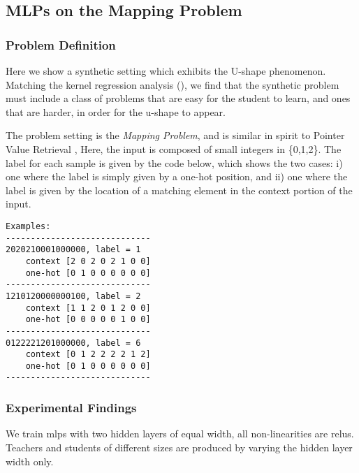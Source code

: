 \subsection{MLPs on the Mapping Problem}
\label{ssec:mlps-on-the-mapping-problem}

\subsubsection{Problem Definition}
\label{sssec:problem-definition}

Here we show a synthetic setting which exhibits the U-shape phenomenon. 
Matching the kernel regression analysis (), 
we find that the synthetic problem must include a class of problems that are easy for the student to learn, and ones that are harder, in order for the u-shape to appear.

The problem setting is the \emph{Mapping Problem}, and is 
similar in spirit to Pointer Value Retrieval \citep{DBLP:journals/corr/abs-2107-12580},
Here, the input is composed of small integers in \{0,1,2\}. 
The label for each sample is given by the code below, which shows the two cases: i) one where the label is simply given by a one-hot position, and ii) one where the label is given by the location of a matching element in the context portion of the input.  

\begin{minipage}{.6\textwidth}
	
\end{minipage}
\begin{minipage}{.4\textwidth}
	\small
	\begin{verbatim}
Examples:
-----------------------------
2020210001000000, label = 1
    context [2 0 2 0 2 1 0 0]
    one-hot [0 1 0 0 0 0 0 0]
-----------------------------
1210120000000100, label = 2
    context [1 1 2 0 1 2 0 0]
    one-hot [0 0 0 0 0 1 0 0]
-----------------------------
0122221201000000, label = 6
    context [0 1 2 2 2 2 1 2]
    one-hot [0 1 0 0 0 0 0 0]
-----------------------------
\end{verbatim}
\end{minipage}

\subsubsection{Experimental Findings}
\label{sssec:experimental-findings}

We train \glspl{mlp} with two hidden layers of equal width, all non-linearities are \glspl{relu}. 
Teachers and students of different sizes are produced by varying the hidden layer width only.

